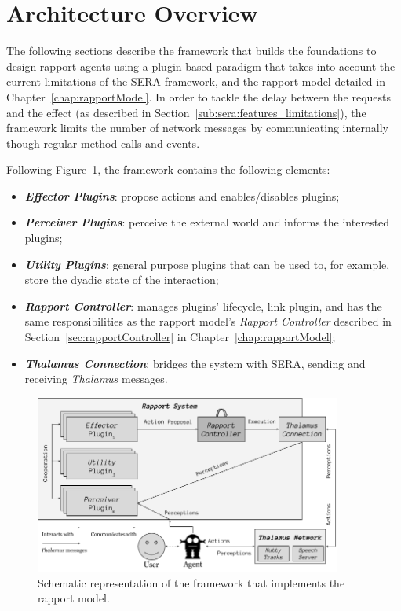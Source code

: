 \section{Architecture Overview}

The following sections describe the framework that builds the foundations to design rapport agents using a plugin-based paradigm that takes into account the current limitations of the \ac{SERA} framework, and the rapport model detailed in Chapter~\ref{chap:rapportModel}. In order to tackle the delay between the requests and the effect (as described in Section~\ref{sub:sera:features_limitations}), the framework limits the number of network messages by communicating internally though regular method calls and events.

Following Figure~\ref{fig:rapport:archicture}, the framework contains the following elements:
\begin{itemize}
	\item \textbf{\textit{Effector Plugins}}: propose actions and enables/disables plugins;
	\item \textbf{\textit{Perceiver Plugins}}: perceive the external world and informs the interested plugins;
	\item \textbf{\textit{Utility Plugins}}: general purpose plugins that can be used to, for example, store the dyadic state of the interaction;
	\item \textbf{\textit{Rapport Controller}}: manages plugins' lifecycle, link plugin, and has the same responsibilities as the rapport model's \textit{Rapport Controller} described in Section~\ref{sec:rapportController} in Chapter~\ref{chap:rapportModel};
	\item \textbf{\textit{Thalamus Connection}}: bridges the system with \ac{SERA}, sending and receiving \textit{Thalamus} messages.
\end{itemize}

\begin{figure}[H]
	\centering
	\includegraphics[width=0.9\textwidth]{images/RapportControllerArchitectureOverview.png}
	\caption{Schematic representation of the framework that implements the rapport model.}
	\label{fig:rapport:archicture}
\end{figure}

